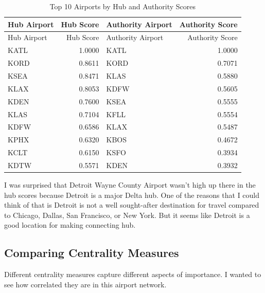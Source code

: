 \documentclass[
  letterpaper,
]{report}
\begin{document}
\begin{longtable}[]{@{}lrlr@{}}
\caption{Top 10 Airports by Hub and Authority Scores}\tabularnewline
\toprule\noalign{}
Hub Airport & Hub Score & Authority Airport & Authority Score \\
\midrule\noalign{}
\endfirsthead
\toprule\noalign{}
Hub Airport & Hub Score & Authority Airport & Authority Score \\
\midrule\noalign{}
\endhead
\bottomrule\noalign{}
\endlastfoot
KATL & 1.0000 & KATL & 1.0000 \\
KORD & 0.8611 & KORD & 0.7071 \\
KSEA & 0.8471 & KLAS & 0.5880 \\
KLAX & 0.8053 & KDFW & 0.5605 \\
KDEN & 0.7600 & KSEA & 0.5555 \\
KLAS & 0.7104 & KFLL & 0.5554 \\
KDFW & 0.6586 & KLAX & 0.5487 \\
KPHX & 0.6320 & KBOS & 0.4672 \\
KCLT & 0.6150 & KSFO & 0.3934 \\
KDTW & 0.5571 & KDEN & 0.3932 \\
\end{longtable}

I was surprised that Detroit Wayne County Airport wasn't high up there
in the hub scores because Detroit is a major Delta hub. One of the
reasons that I could think of that is Detroit is not a well sought-after
destination for travel compared to Chicago, Dallas, San Francisco, or
New York. But it seems like Detroit is a good location for making
connecting hub.

\subsection{Comparing Centrality
Measures}\label{comparing-centrality-measures}

Different centrality measures capture different aspects of importance. I
wanted to see how correlated they are in this airport network.
\end{document}
